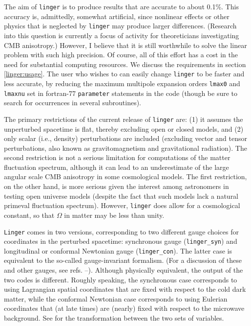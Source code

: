 The aim of {\tt linger} is to produce results that are accurate to about 0.1\%.
This accuracy is, admittedly, somewhat artificial, since nonlinear effects
or other physics that is neglected by {\tt linger} may produce larger
differences.  (Research into this question is currently a focus of activity
for theoreticians investigating CMB anisotropy.)   However, I believe that
it is still worthwhile to solve the linear problem with such high precision.
Of course, all of this effort has a cost in the need for substantial computing
resources.  We discuss the requirements in section \ref{linger:usage}.
The user who wishes to can easily change {\tt linger} to be faster and
less accurate, by reducing the maximum multipole expansion orders {\tt lmax0}
and {\tt lmaxnu} set in fortran-77 {\tt parameter} statements in the code
(though be sure to search for occurrences in several subroutines).
 
The primary restrictions of the current release of {\tt linger} are: (1) it
assumes the unperturbed spacetime is flat, thereby excluding open or closed
models, and (2) only scalar (i.e., density) perturbations are included
(excluding vector and tensor perturbations, also known as gravitomagnetism
and gravitational radiation).  The second restriction is not a serious
limitation for computations of the matter fluctuation spectrum, although it
can lead to an underestimate of the large angular scale CMB anisotropy in
some cosmological models.  The first restriction, on the other hand, is more
serious given the interest among astronomers in testing open universe models
(despite the fact that such models lack a natural primeval fluctuation
spectrum).  However, {\tt linger} does allow for a cosmological constant,
so that $\Omega$ in matter may be less than unity.

{\tt Linger} comes in two versions, corresponding to two different gauge
choices for coordinates in the perturbed spacetime: synchronous gauge
({\tt linger\_syn}) and longitudinal or conformal Newtonian gauge
({\tt linger\_con}).  The latter case is equivalent to the so-called
gauge-invariant formalism.  (For a discussion of these and other gauges,
see refs. \cite{b80}--\cite{blh95}).  Although physically equivalent,
the output of the two codes is different.  Roughly speaking, the synchronous
case corresponds to using Lagrangian spatial coordinates that are fixed
with respect to the cold dark matter, while the conformal Newtonian case
corresponds to using Eulerian coordinates that (at late times) are (nearly)
fixed with respect to the microwave background.  See \cite{mab1} for the
transformation between the two sets of variables.

